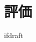 \documentclass{jsarticle}
\begin{document}
    \fi
    \section{評価}

    \expandafter\ifx\csname ifdraft\endcsname\relax
\end{document}
